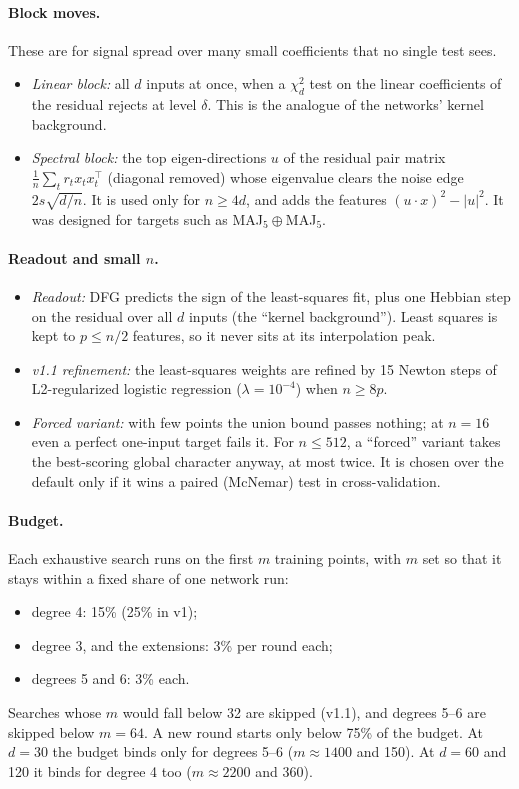 \paragraph{Block moves.} These are for signal spread over many small coefficients that no single test sees.
\begin{itemize}
\item \emph{Linear block:} all $d$ inputs at once, when a $\chi^2_d$ test on the linear coefficients of the residual rejects at level $\delta$. This is the analogue of the networks' kernel background.
\item \emph{Spectral block:} the top eigen-directions $u$ of the residual pair matrix $\tfrac1n\sum_t r_t x_tx_t^\top$ (diagonal removed) whose eigenvalue clears the noise edge $2s\sqrt{d/n}$. It is used only for $n\ge4d$, and adds the features $(u\cdot x)^2-|u|^2$. It was designed for targets such as MAJ$_5\oplus$MAJ$_5$.
\end{itemize}

\paragraph{Readout and small $n$.}
\begin{itemize}
\item \emph{Readout:} DFG predicts the sign of the least-squares fit, plus one Hebbian step on the residual over all $d$ inputs (the ``kernel background''). Least squares is kept to $p\le n/2$ features, so it never sits at its interpolation peak.
\item \emph{v1.1 refinement:} the least-squares weights are refined by 15 Newton steps of L2-regularized logistic regression ($\lambda=10^{-4}$) when $n\ge8p$.
\item \emph{Forced variant:} with few points the union bound passes nothing; at $n=16$ even a perfect one-input target fails it. For $n\le512$, a ``forced'' variant takes the best-scoring global character anyway, at most twice. It is chosen over the default only if it wins a paired (McNemar) test in cross-validation.
\end{itemize}

\paragraph{Budget.} Each exhaustive search runs on the first $m$ training points, with $m$ set so that it stays within a fixed share of one network run:
\begin{itemize}
\item degree 4: 15\% (25\% in v1);
\item degree 3, and the extensions: 3\% per round each;
\item degrees 5 and 6: 3\% each.
\end{itemize}
Searches whose $m$ would fall below 32 are skipped (v1.1), and degrees 5--6 are skipped below $m=64$. A new round starts only below 75\% of the budget. At $d=30$ the budget binds only for degrees 5--6 ($m\approx1400$ and 150). At $d=60$ and 120 it binds for degree 4 too ($m\approx2200$ and 360).

